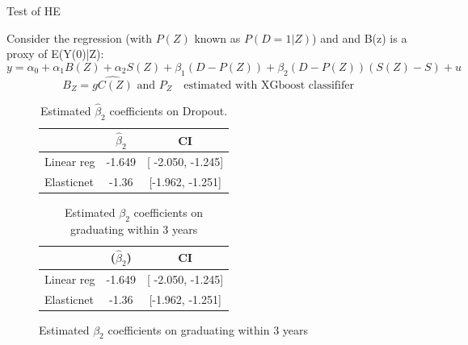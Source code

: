 \documentclass[aspectratio=169]{beamer}
\begin{document}
\begin{frame}{ Test of HE}

Consider the regression (with \( P(Z) \) known as \( P(D = 1 | Z) \)) and and B(z) is a proxy of E(Y(0)|Z):
\[
y = \alpha_0 + \alpha_1 B(Z) + \alpha_2 S(Z) + \beta_1 (D - P(Z)) + \beta_2 (D - P(Z))(S(Z) - S) + u
\]
\[ B_Z = \hat{gC(Z)}  \text{ and }  P_Z  \text{  }   \text{ estimated with XGboost classififer }\]


\begin{figure}[h!]
    \begin{minipage}[b]{0.45\textwidth}
        
       \begin{table}[h]
    \centering
    \begin{tabular}{l c c}
        \hline
        & \textbf{\(\hat\beta_2\) } & \textbf{CI} \\
        \hline
        Linear reg & -1.649 & [ -2.050, -1.245] \\
        Elasticnet & -1.36 & [-1.962, -1.251] \\
        \hline
    \end{tabular}
    \caption{Estimated \(\hat\beta_2\) coefficients on Dropout.}
    \label{tab:beta2_estimates}
\end{table}
    \end{minipage}
    \hspace{0.05\textwidth}
    \begin{minipage}[b]{0.45\textwidth}
        \begin{table}[h]
    \centering
    \begin{tabular}{l c c}
        \hline
        & \textbf{ (\(\hat\beta_2\))} & \textbf{CI} \\
        \hline
        Linear reg & -1.649 & [ -2.050, -1.245] \\
        Elasticnet & -1.36 & [-1.962, -1.251] \\
        \hline
    \end{tabular}
    \caption{Estimated \(\beta_2\) coefficients on graduating within 3 years}
    \label{tab:beta2_estimates}
\end{table}
       
    \end{minipage}
    
 \end{figure}   
\end{frame}
\end{document}
